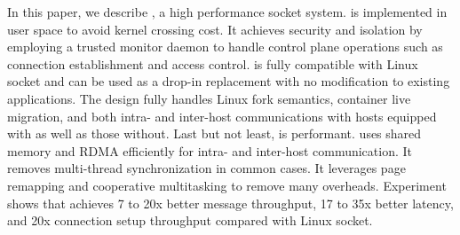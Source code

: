 In this paper, we describe \sys, a high performance socket system. \sys is implemented in user space to avoid kernel crossing cost. It achieves security and isolation by employing a trusted monitor daemon to handle control plane operations such as connection establishment and access control. \sys is fully compatible with Linux socket and can be used as a drop-in replacement with no modification to existing applications. The design fully handles Linux fork semantics, container live migration, and both intra- and inter-host communications with hosts equipped with \sys as well as those without. Last but not least, \sys is performant. \sys uses shared memory and RDMA efficiently for intra- and inter-host communication. It removes multi-thread synchronization in common cases. It leverages page remapping and cooperative multitasking to remove many overheads. Experiment shows that \sys achieves 7 to 20x better message throughput, 17 to 35x better latency, and 20x connection setup throughput compared with Linux socket.